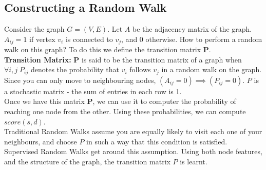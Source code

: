 \documentclass{article}
\begin{document}
\subsection{Constructing a Random Walk} 
Consider the graph  $ G = (V,E)$. Let $A$ be the adjacency matrix of the graph. $A_{ij} = 1$ if vertex $v_i$ is connected to $v_j$, and $0$ otherwise. How to perform a random walk on this graph?
To do this we define the transition matrix $\mathbf P$.\\
\textbf{Transition Matrix:} $\mathbf P$ is said to be the transition matrix of a graph when $\forall i,j \; P_{ij}$ denotes the probability that $v_i$ follows $v_j$ in a random walk on the graph. Since you can only move to neighbouring nodes, $(A_{ij} =0) \implies (P_{ij} = 0)$. $P$ is a stochastic matrix - the sum of entries in each row is 1.
\\
Once we have this matrix $\mathbf P$, we can use it to computer the probability of reaching one node from the other. Using these probabilities, we can compute $score(s,d)$.
\\
Traditional Random Walks assume you are equally likely to visit each one of your neighbours, and choose $P$ in such a way that this condition is satisfied. \\Supervised Random Walks get around this assumption. Using both node features, and the structure of the graph, the transition matrix $P$ is learnt. 
\end{document}
